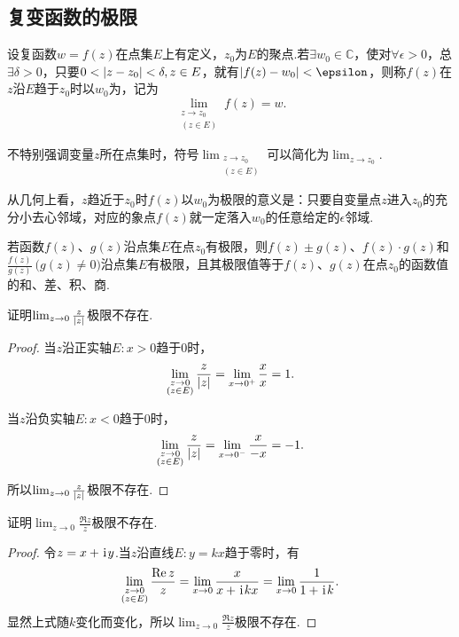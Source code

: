 \subsection{复变函数的极限}
\begin{definition}
设复函数\(w=f(z)\)在点集\(E\)上有定义，\(z_0\)为\(E\)的聚点.若\(\exists w_0 \in \mathbb{C}\)，使对\(\forall \epsilon > 0\)，总\(\exists \delta > 0\)，只要\(0<\abs{z-z_0}<\delta, z \in E\)，就有\(\abs{f(z)-w_0} < \epsilon\)，则称\(f(z)\)在\(z\)沿\(E\)趋于\(z_0\)时以\(w_0\)为，记为\[
\lim_{\substack{z \to z_0 \\ (z \in E)}} f(z) = w.
\]

不特别强调变量\(z\)所在点集时，符号\(\lim_{\substack{z \to z_0 \\ (z \in E)}}\)可以简化为\(\lim_{z \to z_0}\).
\end{definition}
从几何上看，\(z\)趋近于\(z_0\)时\(f(z)\)以\(w_0\)为极限的意义是：只要自变量点\(z\)进入\(z_0\)的充分小去心邻域，对应的象点\(f(z)\)就一定落入\(w_0\)的任意给定的\(\epsilon\)邻域.

\begin{theorem}
若函数\(f(z)\)、\(g(z)\)沿点集\(E\)在点\(z_0\)有极限，则\(f(z) \pm g(z)\)、\(f(z) \cdot g(z)\)和\(\frac{f(z)}{g(z)}\ \bigl(g(z) \neq 0\bigr)\)沿点集\(E\)有极限，且其极限值等于\(f(z)\)、\(g(z)\)在点\(z_0\)的函数值的和、差、积、商.
\end{theorem}

\begin{example}
证明\(\lim_{z\to0} \frac{z}{\abs{z}}\)极限不存在.
\begin{proof}
当\(z\)沿正实轴\(E: x > 0\)趋于0时，\[
\lim_{\substack{z\to0 \\ (z \in E)}} \frac{z}{\abs{z}}
= \lim_{x\to0^+} \frac{x}{x} = 1.
\]

当\(z\)沿负实轴\(E: x < 0\)趋于0时，\[
\lim_{\substack{z\to0 \\ (z \in E)}} \frac{z}{\abs{z}}
= \lim_{x\to0^-} \frac{x}{-x} = -1.
\]

所以\(\lim_{z\to0} \frac{z}{\abs{z}}\)极限不存在.
\end{proof}
\end{example}

\begin{example}
证明\(\lim_{z\to0} \frac{\Re z}{z}\)极限不存在.
\begin{proof}
令\(z = x + \kern1pt\mathrm{i}\kern1pt y\).当\(z\)沿直线\(E: y = kx\)趋于零时，有\[
\lim_{\substack{z\to0 \\ (z \in E)}} \frac{\Re z}{z}
= \lim_{x\to0} \frac{x}{x + \kern1pt\mathrm{i}\kern1pt kx}
= \lim_{x\to0} \frac{1}{1+\kern1pt\mathrm{i}\kern1pt k}.
\]显然上式随\(k\)变化而变化，所以\(\lim_{z\to0} \frac{\Re z}{z}\)极限不存在.
\end{proof}
\end{example}

